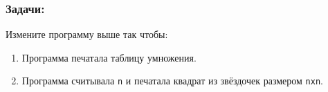 \documentclass{article}
\begin{document}
\subsubsection*{Задачи:}
Измените программу выше так чтобы:
\begin{enumerate}
\item Программа печатала таблицу умножения.
\item Программа считывала \texttt{n} и печатала квадрат из звёздочек размером \texttt{nxn}.
\end{enumerate}
\end{document}
